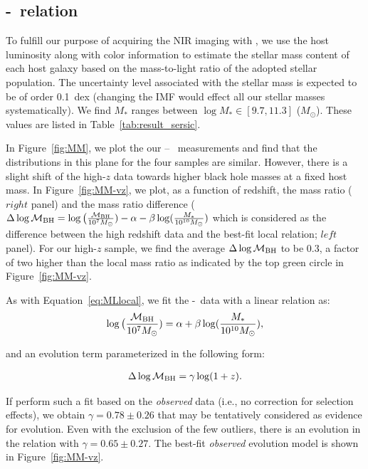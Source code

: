 \documentclass[apj]{emulateapj}
\begin{document}
\subsection{\mbh-\smass\ relation}\label{sec:mm}

To fulfill our purpose of acquiring the NIR imaging with \hst, we use the host luminosity along with color information to estimate the stellar mass content of each host galaxy  based on the mass-to-light ratio of the adopted stellar population. The uncertainty level associated with the stellar mass is expected to be of order 0.1~dex (changing the IMF would effect all our stellar masses systematically). We find $M_*$ ranges between $\log M_* \in [9.7, 11.3]$ ($M_{\odot}$). These values are listed in Table~\ref{tab:result_sersic}. 

In Figure~\ref{fig:MM}, we plot the our \mbh -- \smass\ measurements and find that the distributions in this plane for the four samples are similar. However, there is a slight shift of the high-$z$ data towards higher black hole masses at a fixed host mass. In Figure~\ref{fig:MM-vz}, we plot, as a function of redshift, the mass ratio ($right$ panel) and the mass ratio difference ($\Delta \log \mathcal M_{\rm BH} = \log \big( \frac{\mathcal M_{\rm  BH}}{10^{7}M_{\odot}}) -\alpha-\beta\log(\frac{M_*}{10^{10}M_{\odot}})$ which is considered as the difference between the high redshift data and the best-fit local relation; $left$ panel). For our high-$z$ sample, we find the average $\Delta \log \mathcal M_{\rm BH}$ to be 0.3, a factor of two higher than the local mass ratio as indicated by the top green circle in Figure~\ref{fig:MM-vz}.

As with Equation~\ref{eq:MLlocal}, we fit the \mbh-\smass\ data with a linear relation as:
\begin{eqnarray}
\label{eq:MMlocal}
\log \big( \frac{\mathcal M_{\rm BH}}{10^{7}M_{\odot}})= \alpha + \beta \log(\frac{M_*}{10^{10}M_{\odot}}),
\end {eqnarray}

\noindent and an evolution term parameterized in the following form:

\begin{eqnarray}
\label{eq:offset}
\Delta \log \mathcal M_{\rm BH}= \gamma \log (1 + z).
\end{eqnarray} 

If perform such a fit based on the {\it observed} data (i.e., no correction for selection effects), we obtain $\gamma  = 0.78 \pm 0.26$ that may be tentatively considered as evidence for evolution. Even with the exclusion of the few outliers, there is an evolution in the relation with $\gamma  = 0.65 \pm 0.27$. The best-fit {\it observed} evolution model is shown in Figure~\ref{fig:MM-vz}.
\end{document}
